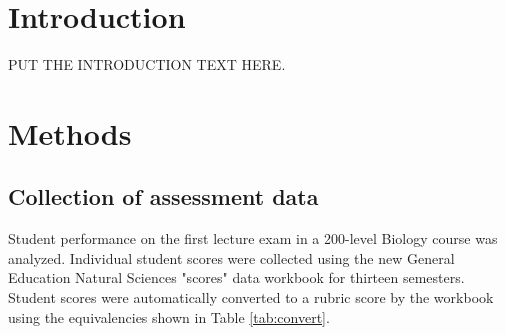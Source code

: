 \documentclass[fleqn,10pt]{SelfArx}\usepackage[]{graphicx}\usepackage[]{color}
\affiliation{\textsuperscript{1}\textit{General Education Coordinator, Ferris State University}} %
\begin{document}
\flushbottom %

\maketitle %

\tableofcontents %

{
	\fancyhf{}
}
\thispagestyle{firststyle}











\section{Introduction} %

PUT THE INTRODUCTION TEXT HERE.


\section{Methods}

\subsection{Collection of assessment data}
Student performance on the first lecture exam in a 200-level Biology course was analyzed. Individual student scores were collected using the new General Education Natural Sciences "scores" data workbook for thirteen semesters. Student scores were automatically converted to a rubric score by the workbook using the equivalencies shown in Table \ref{tab:convert}.
\end{document}

